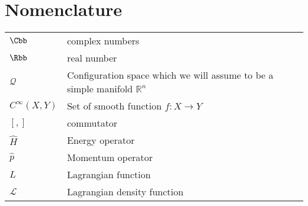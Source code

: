 \chapter*{Nomenclature}

\begin{flushleft}
\begin{longtable}[l]{ll} %
    $\Cbb$ & complex numbers \\[1mm]
    $\Rbb$ & real number \\[1mm]
    $\mathcal{Q}$ & Configuration space which we will assume to be a simple manifold $\mathbb{R}^{n}$ \\[1mm]
    $C^{\infty}(X, Y)$ & Set of smooth function $f: X \to Y$ \\[1mm]
    $[,]$ & commutator \\[1mm]
    $\hat{H}$ & Energy operator \\[1mm]
    $\hat{p}$ & Momentum operator \\[1mm]
    $L$ & Lagrangian function \\[1mm]
    $\mathcal{L}$ & Lagrangian density function \\[1mm]
\end{longtable}
\end{flushleft}
